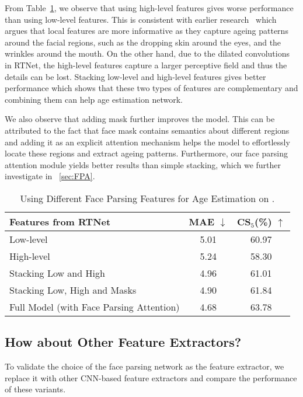 From Table~\ref{tab:which-features}, we observe that using high-level features gives worse performance than using low-level features. This is consistent with earlier research~\cite{hanDemographicEstimationFace2015} which argues that local features are more informative as they capture ageing patterns around the facial regions, such as the dropping skin around the eyes, and the wrinkles around the mouth. On the other hand, due to the dilated convolutions in RTNet, the high-level features capture a larger perceptive field and thus the details can be lost. Stacking low-level and high-level features gives better performance which shows that these two types of features are complementary and combining them can help age estimation network. 

We also observe that adding mask further improves the model. This can be attributed to the fact that face mask contains semantics about different regions and adding it as an explicit attention mechanism helps the model to effortlessly locate these regions and extract ageing patterns. Furthermore, our face parsing attention module yields better results than simple stacking, which we further investigate in \sectionautorefname~\ref{sec:FPA}.
\begin{table}
    \caption{Using Different Face Parsing Features for Age Estimation on \imdbc.}
    \label{tab:which-features}
    \centering
    \begin{tabular}{l|c|c}
    \toprule
        Features from RTNet & MAE $\downarrow$ & CS$_5$(\%) $\uparrow$ \\ \hline
        Low-level &5.01 & 60.97 \\ 
        High-level &5.24 & 58.30 \\ 
        Stacking Low and High &4.96 & 61.01 \\ 
        Stacking Low, High and Masks&4.90 & 61.84 \\ \hline
        Full Model (with Face Parsing Attention) &4.68  &63.78 \\  
    \bottomrule
    \end{tabular}
\end{table}







\subsection{How about Other Feature Extractors?}
To validate the choice of the face parsing network as the feature extractor, we replace it with other CNN-based feature extractors and compare the performance of these variants. 

